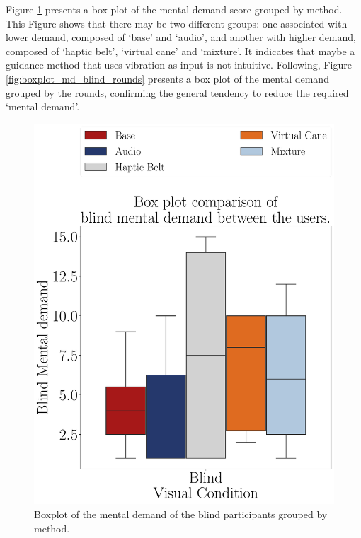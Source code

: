Figure \ref{fig:boxplot_md_blind_scene}  presents a box plot of the mental demand score grouped by method. This Figure shows that there may be two different groups: one associated with lower demand, composed of ‘base’ and ‘audio’, and another with higher demand, composed of ‘haptic belt’, ‘virtual cane’ and ‘mixture’. It indicates that maybe a guidance method that uses vibration as input is not intuitive. Following, Figure \ref{fig:boxplot_md_blind_rounds} presents a box plot of the mental demand grouped by the rounds, confirming the general tendency to reduce the required ‘mental demand’. 

\begin{figure}[!htb]
    \centering
    \begin{minipage}{0.45\textwidth}
        \centering
        \includegraphics[width = \textwidth]{Resultados/Nasa/Figuras/pdf/boxplot_md_blind_scene.pdf}
        \caption{Boxplot of the mental demand of the blind participants grouped by method.}
        \label{fig:boxplot_md_blind_scene}
    \end{minipage}

\end{figure}
